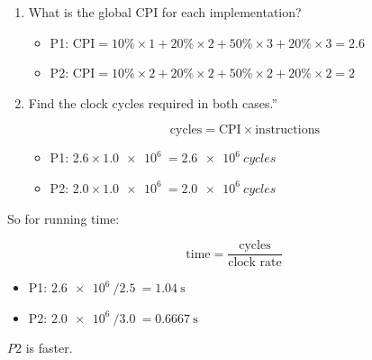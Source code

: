 \documentclass[paper=a4, fontsize=11pt]{scrartcl} %
\begin{document}
\begin{enumerate}
\item
  \begin{fancyquotes}
    What is the global CPI for each implementation?
  \end{fancyquotes}

  \begin{itemize}
  \item{P1:} $\text{CPI} = 10\%\times 1 + 20\%\times 2 + 50\%\times 3
    + 20\%\times 3 = 2.6$
  \item{P2:} $\text{CPI} = 10\%\times 2 + 20\%\times 2 + 50\%\times 2
    + 20\%\times 2 = 2$
  \end{itemize}

\item
  \begin{fancyquotes}
    Find the clock cycles required in both cases.”
  \end{fancyquotes}

  $$\text{cycles} = \text{CPI}\times\text{instructions}$$

  \begin{itemize}
  \item{P1:} $2.6\times\SI{1.0e6}{} = \SI{2.6e6}{cycles}$
  \item{P2:} $2.0\times\SI{1.0e6}{} = \SI{2.0e6}{cycles}$
  \end{itemize}
\end{enumerate}

So for running time:

$$\text{time} = \frac{\text{cycles}}{\text{clock rate}}$$

\begin{itemize}
\item{P1:} $\SI{2.6e6}{} / \SI{2.5}{} = \SI{1.04}{\second}$
\item{P2:} $\SI{2.0e6}{} / \SI{3.0}{} = \SI{0.6667}{\second}$
\end{itemize}

$P2$ is faster.

\pagebreak

\section{}
\end{document}
